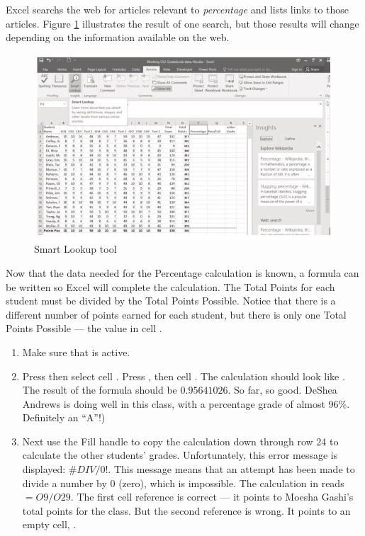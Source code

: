 Excel searchs the web for articles relevant to \textit{percentage} and lists links to those articles. Figure \ref{03:fig06} illustrates the result of one search, but those results will change depending on the information available on the web.

\begin{figure}[H]
	\centering
	\includegraphics[width=\maxwidth{.95\linewidth}]{gfx/ch03_fig06}
	\caption{Smart Lookup tool}
	\label{03:fig06}
\end{figure}

Now that the data needed for the Percentage calculation is known, a formula can be written so Excel will complete the calculation. The Total Points for each student must be divided by the Total Points Possible. Notice that there is a different number of points earned for each student, but there is only one Total Points Possible --- the value in cell .

\begin{enumerate}
	\item Make sure that  is active.
	\item Press \fmtTyping{=} then select cell . Press \fmtTyping{/}, then cell . The calculation should look like . The result of the formula should be $ 0.95641026 $. So far, so good. DeShea Andrews is doing well in this class, with a percentage grade of almost 96\%. Definitely an ``A''!)
	\item Next use the Fill handle to copy the calculation down through row 24 to calculate the other students' grades. Unfortunately, this error message is displayed: $ \#DIV/0! $. This message means that an attempt has been made to divide a number by $ 0 $ (zero), which is impossible. The calculation in  reads $ =O9/O29 $. The first cell reference is correct --- it points to Moesha Gashi's total points for the class. But the second reference is wrong. It points to an empty cell, .

\end{enumerate}

